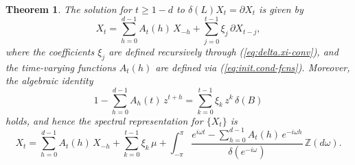 \documentclass[a4paper]{book}
\def\ZZ{\mathbb Z}
\newtheorem{Theorem}{Theorem}
\begin{document}
 \begin{Theorem}
 \label{thm:nonstat-rep}
 The solution for $t \geq 1-d$ to $\delta (L) X_t = \partial X_t$ is given by
\begin{equation}
 \label{eq:nonstatCausalRep}
 X_t  = \sum_{h=0}^{d-1} A_{t} (h) \, X_{-h} + 
  \sum_{j=0}^{t-1} \xi_j \, \partial X_{t-j},
\end{equation}
 where the coefficients $\xi_j$ are defined recursively through (\ref{eq:delta.xi-conv}),
  and the time-varying functions $A_t (h)$ are defined via (\ref{eq:init.cond-fcns}).
  Moreover, the algebraic identity 
\begin{equation}
 \label{eq:Identity1}
  1 - \sum_{h=0}^{d-1} A_{h} (t) \, z^{t+h} = \sum_{k=0}^{t-1} \xi_k \, z^k
  \, \delta (B)
\end{equation}
holds, and hence the   spectral representation for
 $\{ X_t\}$ is
\begin{equation}
 \label{eq:nonstatRep-spec}
  X_t = \sum_{h=0}^{d-1} A_{t} (h) \, X_{-h}  +
   \sum_{k=0}^{t-1} \xi_k \, \mu +
  \int_{-\pi}^{\pi}
   \frac{ e^{i \omega t} - \sum_{h=0}^{d-1} A_{t} (h) \,  e^{-i \omega h } 
    }{ \delta (e^{-i \omega}) } \, \ZZ (d\omega).
\end{equation}
\end{Theorem}  
  
\end{document}
